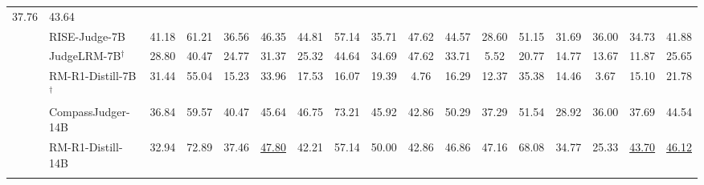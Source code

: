 \begin{table}[t!]
{\begin{tabular}{llccccccccccccccc}
  37.76 &
  43.64 \\
 &
  \cellcolor{orange!50}RISE-Judge-7B &
  {\color[HTML]{9B9B9B} 41.18} &
  {\color[HTML]{9B9B9B} 61.21} &
  {\color[HTML]{9B9B9B} 36.56} &
  46.35 &
  {\color[HTML]{9B9B9B} 44.81} &
  {\color[HTML]{9B9B9B} 57.14} &
  {\color[HTML]{9B9B9B} 35.71} &
  {\color[HTML]{9B9B9B} 47.62} &
  44.57 &
  {\color[HTML]{9B9B9B} 28.60} &
  {\color[HTML]{9B9B9B} 51.15} &
  {\color[HTML]{9B9B9B} 31.69} &
  {\color[HTML]{9B9B9B} 36.00} &
  34.73 &
  41.88 \\
 &
  \cellcolor{ForestGreen!20}JudgeLRM-7B$^\dagger$ &
  {\color[HTML]{9B9B9B} 28.80} &
  {\color[HTML]{9B9B9B} 40.47} &
  {\color[HTML]{9B9B9B} 24.77} &
  31.37 &
  {\color[HTML]{9B9B9B} 25.32} &
  {\color[HTML]{9B9B9B} 44.64} &
  {\color[HTML]{9B9B9B} 34.69} &
  {\color[HTML]{9B9B9B} 47.62} &
  33.71 &
  {\color[HTML]{9B9B9B} 5.52} &
  {\color[HTML]{9B9B9B} 20.77} &
  {\color[HTML]{9B9B9B} 14.77} &
  {\color[HTML]{9B9B9B} 13.67} &
  11.87 &
  25.65 \\
 &
  \cellcolor{ForestGreen!20}RM-R1-Distill-7B$^\dagger$ &
  {\color[HTML]{9B9B9B} 31.44} &
  {\color[HTML]{9B9B9B} 55.04} &
  {\color[HTML]{9B9B9B} 15.23} &
  33.96 &
  {\color[HTML]{9B9B9B} 17.53} &
  {\color[HTML]{9B9B9B} 16.07} &
  {\color[HTML]{9B9B9B} 19.39} &
  {\color[HTML]{9B9B9B} 4.76} &
  16.29 &
  {\color[HTML]{9B9B9B} 12.37} &
  {\color[HTML]{9B9B9B} 35.38} &
  {\color[HTML]{9B9B9B} 14.46} &
  {\color[HTML]{9B9B9B} 3.67} &
  15.10 &
  21.78 \\
 &
  \cellcolor{Goldenrod!30}CompassJudger-14B &
  {\color[HTML]{9B9B9B} 36.84} &
  {\color[HTML]{9B9B9B} 59.57} &
  {\color[HTML]{9B9B9B} 40.47} &
  45.64 &
  {\color[HTML]{9B9B9B} 46.75} &
  {\color[HTML]{9B9B9B} 73.21} &
  {\color[HTML]{9B9B9B} 45.92} &
  {\color[HTML]{9B9B9B} 42.86} &
  50.29 &
  {\color[HTML]{9B9B9B} 37.29} &
  {\color[HTML]{9B9B9B} 51.54} &
  {\color[HTML]{9B9B9B} 28.92} &
  {\color[HTML]{9B9B9B} 36.00} &
  37.69 &
  44.54 \\
 &
  \cellcolor{ForestGreen!20}RM-R1-Distill-14B &
  {\color[HTML]{9B9B9B} 32.94} &
  {\color[HTML]{9B9B9B} 72.89} &
  {\color[HTML]{9B9B9B} 37.46} &
  {\underline{47.80}} &
  {\color[HTML]{9B9B9B} 42.21} &
  {\color[HTML]{9B9B9B} 57.14} &
  {\color[HTML]{9B9B9B} 50.00} &
  {\color[HTML]{9B9B9B} 42.86} &
  46.86 &
  {\color[HTML]{9B9B9B} 47.16} &
  {\color[HTML]{9B9B9B} 68.08} &
  {\color[HTML]{9B9B9B} 34.77} &
  {\color[HTML]{9B9B9B} 25.33} &
  {\underline{43.70}} &
  {\underline{46.12}} \\
 \arrayrulecolor{gray}\hdashline

\end{tabular}}
\end{table}
